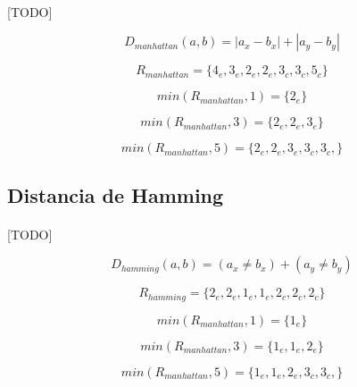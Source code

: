 \documentclass{article}
\begin{document}
			\paragraph{}
			[TODO]

			\begin{equation}
				D_{manhattan}(a,b) = |a_x - b_x| + |a_y - b_y|
			\end{equation}

			\begin{equation}
				R_{manhattan} = \{4_e, 3_e, 2_e, 2_e, 3_c, 3_c, 5_c\}
			\end{equation}

			\begin{equation}
				min(R_{manhattan},1) = \{ 2_e \}
			\end{equation}

			\begin{equation}
				min(R_{manhattan},3) = \{ 2_e, 2_e, 3_e\}
			\end{equation}

			\begin{equation}
				min(R_{manhattan},5) = \{ 2_e, 2_e, 3_e, 3_c, 3_c, \}
			\end{equation}

		\subsection{Distancia de Hamming}

			\paragraph{}
			[TODO]

			\begin{equation}
				D_{hamming}(a,b) = (a_x \neq b_x) + (a_y \neq b_y)
			\end{equation}

			\begin{equation}
				R_{hamming} = \{2_e, 2_e, 1_e, 1_e, 2_c, 2_c, 2_c\}
			\end{equation}

			\begin{equation}
				min(R_{manhattan},1) = \{ 1_e \}
			\end{equation}

			\begin{equation}
				min(R_{manhattan},3) = \{ 1_e, 1_e, 2_e\}
			\end{equation}

			\begin{equation}
				min(R_{manhattan},5) = \{ 1_e, 1_e, 2_e, 3_c, 3_c, \}
			\end{equation}
\end{document}
